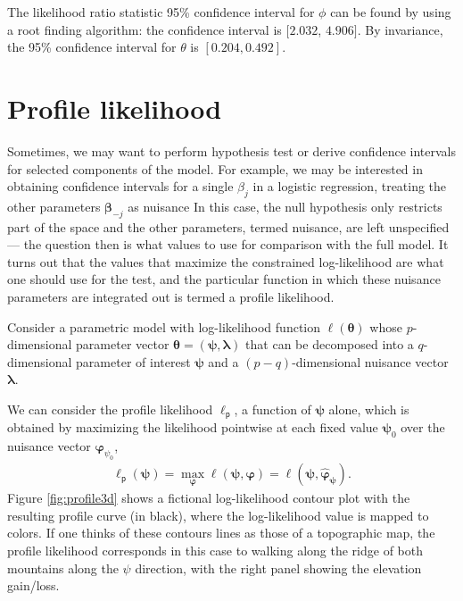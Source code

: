 \documentclass[
  11pt,
  letterpaper,
]{book}
\theoremstyle{definition}
\theoremstyle{definition}
\theoremstyle{definition}
\theoremstyle{remark}
\begin{document}
The likelihood ratio statistic 95\% confidence interval for \(\phi\) can be found by using a root finding algorithm: the confidence interval is \([2.032\), \(4.906]\). By invariance, the 95\% confidence interval for \(\theta\) is \([0.204, 0.492]\).

\hypertarget{profile-likelihood}{%
\section{Profile likelihood}\label{profile-likelihood}}

Sometimes, we may want to perform hypothesis test or derive confidence intervals for selected components of the model. For example, we may be interested in obtaining confidence intervals for a single \(\beta_j\) in a logistic regression, treating the other parameters \(\boldsymbol{\beta}_{-j}\) as nuisance In this case, the null hypothesis only restricts part of the space and the other parameters, termed nuisance, are left unspecified --- the question then is what values to use for comparison with the full model. It turns out that the values that maximize the constrained log-likelihood are what one should use for the test, and the particular function in which these nuisance parameters are integrated out is termed a profile likelihood.

Consider a parametric model with log-likelihood function \(\ell(\boldsymbol{\theta})\) whose \(p\)-dimensional parameter vector \(\boldsymbol{\theta}=(\boldsymbol{\psi}, \boldsymbol{\lambda})\) that can be decomposed into a \(q\)-dimensional parameter of interest \(\boldsymbol{\psi}\) and a \((p-q)\)-dimensional nuisance vector \(\boldsymbol{\lambda}\).

We can consider the profile likelihood \(\ell_{\mathsf{p}}\), a function of \(\boldsymbol{\psi}\) alone, which is obtained by maximizing the likelihood pointwise at each fixed value \(\boldsymbol{\psi}_0\) over the nuisance vector \(\boldsymbol{\varphi}_{\psi_0}\),
\begin{align*}
\ell_{\mathsf{p}}(\boldsymbol{\psi})=\max_{\boldsymbol{\varphi}}\ell(\boldsymbol{\psi}, \boldsymbol{\varphi})=\ell(\boldsymbol{\psi}, \widehat{\boldsymbol{\varphi}}_{\boldsymbol{\psi}}).
\end{align*}
Figure \ref{fig:profile3d} shows a fictional log-likelihood contour plot with the resulting profile curve (in black), where the log-likelihood value is mapped to colors. If one thinks of these contours lines as those of a topographic map, the profile likelihood corresponds in this case to walking along the ridge of both mountains along the \(\psi\) direction, with the right panel showing the elevation gain/loss.
\end{document}
